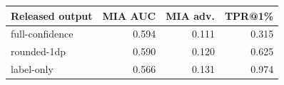 \begin{tabular}{lrrr}
\toprule
Released output & MIA AUC & MIA adv. & TPR@1\% \\
\midrule
full-confidence & 0.594 & 0.111 & 0.315 \\
rounded-1dp & 0.590 & 0.120 & 0.625 \\
label-only & 0.566 & 0.131 & 0.974 \\
\bottomrule
\end{tabular}
